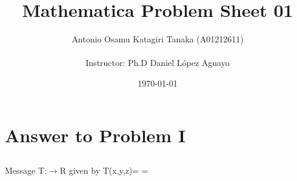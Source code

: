 \documentclass[11pt,a4paper]{article}
\title
{
    Mathematica Problem Sheet 01
}
\author
{    
    Antonio Osamu Katagiri Tanaka (A01212611) \\
    \\
    Instructor: Ph.D Daniel L{\' o}pez Aguayo
}
\date{\today}
\providecommand{\keywords}[1]
{
    \\
    \\
    \small
    \textbf{\textit{Keywords:}} #1
}
\begin{document}
\setlength\parindent{0pt} %


\maketitle


\clearpage








\section{Answer to Problem I}\label{sec:P01}

\subsection{}
\begin{mmaCell}{Message}
T:\(\pmb{\rightarrow}\)R given by T(x,y,z)=
=
\end{mmaCell}
\end{document}
